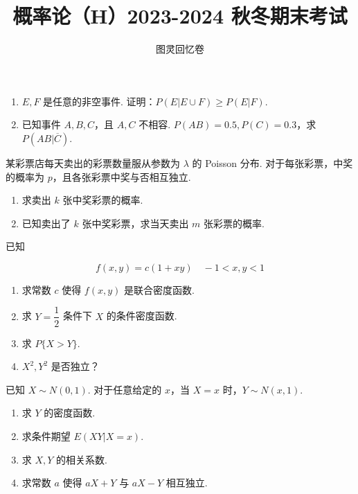 \documentclass{ctexart}
\title{\vspace{-4em}\textbf{概率论（H）2023-2024 秋冬期末考试}}
\author{图灵回忆卷}
\date{\zhtoday}
\begin{document}
\maketitle

\begin{enumerate}
    \item $E,F$ 是任意的非空事件. 证明：$ P(E | E \cup F) \geqslant P(E | F) $.

    \item 已知事件 $A, B, C$，且 $A, C$ 不相容. $P(AB) = 0.5, P(C) = 0.3$，求 $P(AB|\overline{C})$.
\end{enumerate}

某彩票店每天卖出的彩票数量服从参数为 $\lambda$ 的 Poisson 分布. 对于每张彩票，中奖的概率为 $p$，且各张彩票中奖与否相互独立.
\begin{enumerate}
\item 求卖出 $k$ 张中奖彩票的概率.

\item 已知卖出了 $k$ 张中奖彩票，求当天卖出 $m$ 张彩票的概率.
\end{enumerate}

已知

\[ f(x,y) = c(1+xy) \quad -1 < x, y < 1 \]

\begin{enumerate}
    \item 求常数 $c$ 使得 $f(x,y)$ 是联合密度函数.

    \item 求 $Y = \dfrac{1}{2}$ 条件下 $X$ 的条件密度函数.

    \item 求 $P\{X > Y\}$.

    \item $X^2, Y^2$ 是否独立？
\end{enumerate}

已知 $X \sim N(0, 1)$. 对于任意给定的 $x$，当 $X = x$ 时，$Y \sim N(x, 1)$.
\begin{enumerate}
    \item 求 $Y$ 的密度函数.

    \item 求条件期望 $E(XY|X = x)$.

    \item 求 $X, Y$ 的相关系数.

    \item 求常数 $a$ 使得 $aX+Y$ 与 $aX-Y$ 相互独立.
\end{enumerate}
\end{document}

